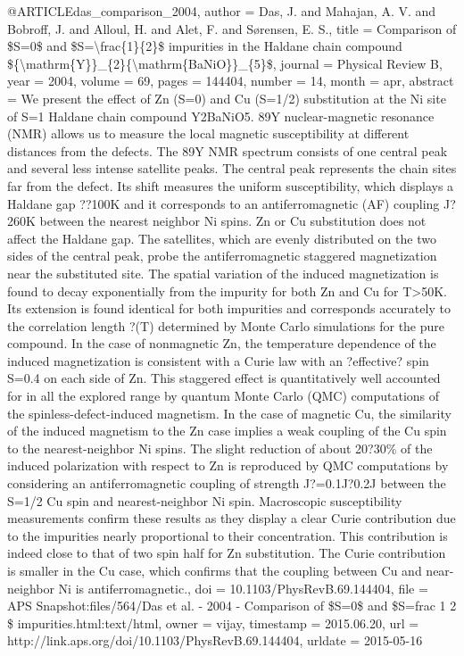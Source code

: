 @ARTICLE{das_comparison_2004,
  author = {Das, J. and Mahajan, A. V. and Bobroff, J. and Alloul, H. and Alet,
	F. and Sørensen, E. S.},
  title = {Comparison of \${S}=0\$ and \${S}={\textbackslash}frac\{1\}\{2\}\$
	impurities in the {Haldane} chain compound \$\{{\textbackslash}mathrm\{{Y}\}\}\_\{2\}\{{\textbackslash}mathrm\{{BaNiO}\}\}\_\{5\}\$},
  journal = {Physical Review B},
  year = {2004},
  volume = {69},
  pages = {144404},
  number = {14},
  month = apr,
  abstract = {We present the effect of Zn (S=0) and Cu (S=1/2) substitution at the
	Ni site of S=1 Haldane chain compound Y2BaNiO5. 89Y nuclear-magnetic
	resonance (NMR) allows us to measure the local magnetic susceptibility
	at different distances from the defects. The 89Y NMR spectrum consists
	of one central peak and several less intense satellite peaks. The
	central peak represents the chain sites far from the defect. Its
	shift measures the uniform susceptibility, which displays a Haldane
	gap ??100K and it corresponds to an antiferromagnetic (AF) coupling
	J?260K between the nearest neighbor Ni spins. Zn or Cu substitution
	does not affect the Haldane gap. The satellites, which are evenly
	distributed on the two sides of the central peak, probe the antiferromagnetic
	staggered magnetization near the substituted site. The spatial variation
	of the induced magnetization is found to decay exponentially from
	the impurity for both Zn and Cu for T{\textgreater}50K. Its extension
	is found identical for both impurities and corresponds accurately
	to the correlation length ?(T) determined by Monte Carlo simulations
	for the pure compound. In the case of nonmagnetic Zn, the temperature
	dependence of the induced magnetization is consistent with a Curie
	law with an ?effective? spin S=0.4 on each side of Zn. This staggered
	effect is quantitatively well accounted for in all the explored range
	by quantum Monte Carlo (QMC) computations of the spinless-defect-induced
	magnetism. In the case of magnetic Cu, the similarity of the induced
	magnetism to the Zn case implies a weak coupling of the Cu spin to
	the nearest-neighbor Ni spins. The slight reduction of about 20?30\%
	of the induced polarization with respect to Zn is reproduced by QMC
	computations by considering an antiferromagnetic coupling of strength
	J?=0.1J?0.2J between the S=1/2 Cu spin and nearest-neighbor Ni spin.
	Macroscopic susceptibility measurements confirm these results as
	they display a clear Curie contribution due to the impurities nearly
	proportional to their concentration. This contribution is indeed
	close to that of two spin half for Zn substitution. The Curie contribution
	is smaller in the Cu case, which confirms that the coupling between
	Cu and near-neighbor Ni is antiferromagnetic.},
  doi = {10.1103/PhysRevB.69.144404},
  file = {APS Snapshot:files/564/Das et al. - 2004 - Comparison of \$S=0\$ and \$S=frac 1 2 \$ impurities.html:text/html},
  owner = {vijay},
  timestamp = {2015.06.20},
  url = {http://link.aps.org/doi/10.1103/PhysRevB.69.144404},
  urldate = {2015-05-16}
}

